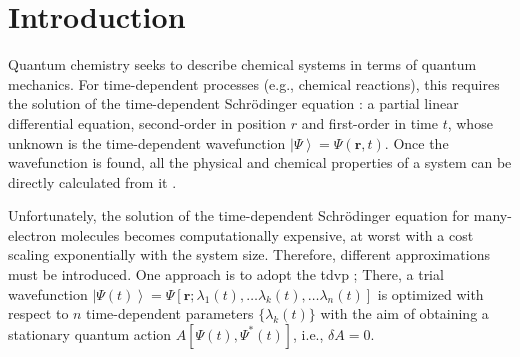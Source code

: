 \documentclass{aux/ttuthes2007}
\newcommand{\ket}[1]{\ensuremath{\left|#1\right\rangle}}
\begin{document}



\listoffigures	%




\mainmatter


%
\chapter{\textbf{Introduction}}

Quantum chemistry  seeks to describe chemical systems in terms of quantum mechanics.
For time-dependent processes (e.g., chemical reactions), this requires the solution of the time-dependent Schrödinger equation : a partial linear differential equation, second-order in position $r$ and first-order in time $t$, whose unknown is the time-dependent wavefunction $\ket \Psi = \Psi(\bm r, t)$.
Once the wavefunction is found, all the physical and chemical properties of a system can be directly calculated from it .

Unfortunately, the solution of the time-dependent Schrödinger equation for many-electron molecules becomes computationally expensive, at worst with a cost scaling exponentially with the system size.
Therefore, different approximations must be introduced.
One approach is to adopt the \gls{tdvp} ;
There, a trial wavefunction $\ket {\Psi(t)} = \Psi\left[\bm r; \lambda_1(t), \ldots \lambda_k(t), \ldots \lambda_n(t) \right ]$ is optimized with respect to $n$ time-dependent parameters $\{\lambda_k(t)\}$ with the aim of obtaining a stationary quantum action $A \left[ \Psi(t), \Psi^*(t) \right ] $, i.e., $\delta A = 0$.
\end{document}
